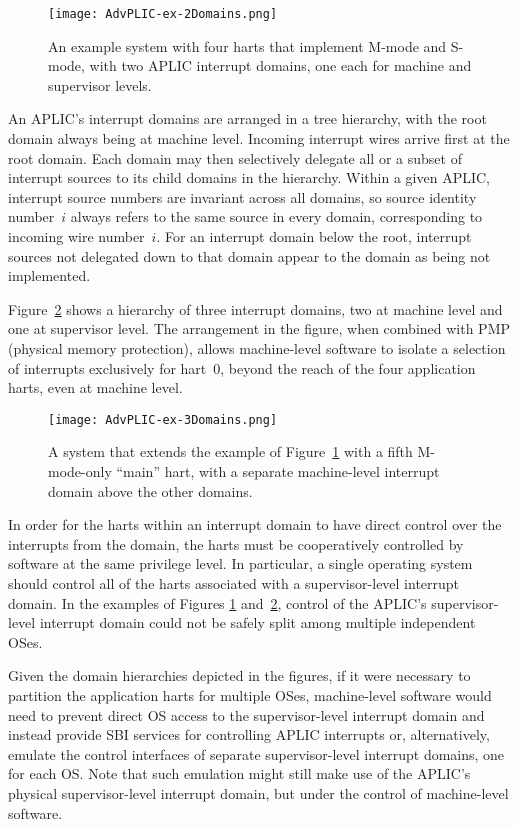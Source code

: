 \begin{figure}[th]
\centerline{\texttt{[image: AdvPLIC-ex-2Domains.png]}}
\caption{%
An example system with four harts that implement \mbox{M-mode} and
\mbox{S-mode}, with two APLIC interrupt domains, one each for machine
and supervisor levels.%
}
\label{fig:AdvPLIC-ex-2Domains}
\end{figure}

An APLIC's interrupt domains are arranged in a tree hierarchy, with the
root domain always being at machine level.
Incoming interrupt wires arrive first at the root domain.
Each domain may then selectively delegate all or a subset of interrupt
sources to its child domains in the hierarchy.
Within a given APLIC, interrupt source numbers are invariant across all
domains, so source identity number~$i$ always refers to the same source
in every domain, corresponding to incoming wire number~$i$.
For an interrupt domain below the root, interrupt sources not delegated
down to that domain appear to the domain as being not implemented.

Figure~\ref{fig:AdvPLIC-ex-3Domains} shows a hierarchy of three
interrupt domains, two at machine level and one at supervisor level.
The arrangement in the figure, when combined with PMP (physical memory
protection), allows machine-level software to isolate a selection
of interrupts exclusively for hart~0, beyond the reach of the four
application harts, even at machine level.

\begin{figure}[th]
\centerline{\texttt{[image: AdvPLIC-ex-3Domains.png]}}
\caption{%
A {\RISCV} system that extends the example of
Figure~\ref{fig:AdvPLIC-ex-2Domains} with a fifth \mbox{M-mode}-only
``main'' hart, with a separate machine-level interrupt domain above
the other domains.%
}
\label{fig:AdvPLIC-ex-3Domains}
\end{figure}

\FloatBarrier

\begin{commentary}
In order for the harts within an interrupt domain to have direct
control over the interrupts from the domain, the harts must be
cooperatively controlled by software at the same privilege level.
In particular, a single operating system should control all of the
harts associated with a supervisor-level interrupt domain.
In the examples of Figures \ref{fig:AdvPLIC-ex-2Domains}
and~\ref{fig:AdvPLIC-ex-3Domains}, control of the APLIC's
supervisor-level interrupt domain could not be safely split among
multiple independent OSes.

Given the domain hierarchies depicted in the figures, if it were
necessary to partition the application harts for multiple OSes,
machine-level software would need to prevent direct OS access to the
supervisor-level interrupt domain and instead provide SBI services
for controlling APLIC interrupts or, alternatively, emulate the control
interfaces of separate supervisor-level interrupt domains, one for each
OS.
Note that such emulation might still make use of the APLIC's
physical supervisor-level interrupt domain, but under the control of
machine-level software.
\end{commentary}

